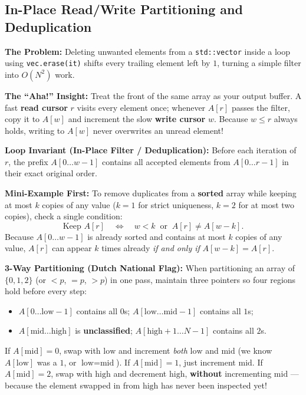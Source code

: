 \documentclass[11pt,a4paper]{article}
\theoremstyle{definition}
\newcommand{\painbeat}{\textbf{\color{accentamber}The Problem:} }
\newcommand{\ahabeat}{\textbf{\color{accentteal}The ``Aha!'' Insight:} }
\newcommand{\examplebeat}{\textbf{\color{primaryblue}Mini-Example First:} }
\newcommand{\invariantbeat}[1]{\par\noindent\textbf{\color{accentteal}Loop Invariant (#1):} }
\begin{document}
\subsection{In-Place Read/Write Partitioning and Deduplication}

\painbeat Deleting unwanted elements from a \texttt{std::vector} inside a loop using \texttt{vec.erase(it)} shifts every trailing element left by $1$, turning a simple filter into $O(N^2)$ work.

\ahabeat Treat the front of the same array as your output buffer. A fast \textbf{read cursor} $r$ visits every element once; whenever $A[r]$ passes the filter, copy it to $A[w]$ and increment the slow \textbf{write cursor} $w$. Because $w \le r$ always holds, writing to $A[w]$ never overwrites an unread element!

\invariantbeat{In-Place Filter / Deduplication} Before each iteration of $r$, the prefix $A[0 \dots w-1]$ contains all accepted elements from $A[0 \dots r-1]$ in their exact original order.

\examplebeat To remove duplicates from a \textbf{sorted} array while keeping at most $k$ copies of any value ($k = 1$ for strict uniqueness, $k = 2$ for at most two copies), check a single condition:
$$\text{Keep } A[r] \quad \Longleftrightarrow \quad w < k \;\;\text{or}\;\; A[r] \ne A[w - k].$$
Because $A[0 \dots w-1]$ is already sorted and contains at most $k$ copies of any value, $A[r]$ can appear $k$ times already \emph{if and only if} $A[w - k] = A[r]$.

\textbf{3-Way Partitioning (Dutch National Flag):} When partitioning an array of $\{0, 1, 2\}$ (or $<p$, $=p$, $>p$) in one pass, maintain three pointers so four regions hold before every step:
\begin{itemize}[itemsep=1pt, topsep=2pt]
    \item $A[0 \dots \text{low}-1]$ contains all $0$s; $A[\text{low} \dots \text{mid}-1]$ contains all $1$s;
    \item $A[\text{mid} \dots \text{high}]$ is \textbf{unclassified}; $A[\text{high}+1 \dots N-1]$ contains all $2$s.
\end{itemize}
If $A[\text{mid}] = 0$, swap with $\text{low}$ and increment \emph{both} $\text{low}$ and $\text{mid}$ (we know $A[\text{low}]$ was a $1$, or $\text{low} = \text{mid}$). If $A[\text{mid}] = 1$, just increment $\text{mid}$. If $A[\text{mid}] = 2$, swap with $\text{high}$ and decrement $\text{high}$, \textbf{without} incrementing $\text{mid}$ --- because the element swapped in from $\text{high}$ has never been inspected yet!
\end{document}

